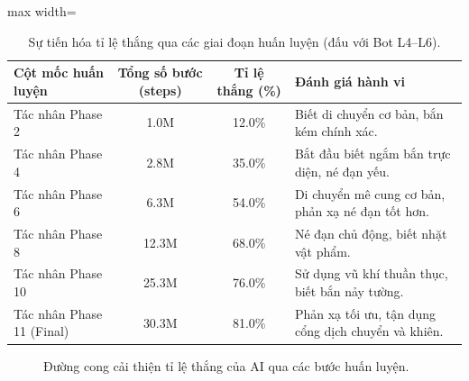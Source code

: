 \documentclass[a4paper, 12pt]{report}
\begin{document}
  \begin{table}[H]
  \centering
  \caption{Sự tiến hóa tỉ lệ thắng qua các giai đoạn huấn luyện (đấu với Bot L4--L6).}
  \label{tab:curriculum_winrate}
  \renewcommand{\arraystretch}{1.2}
  \small
  \begin{adjustbox}{max width=\textwidth}
  \begin{tabular}{l c c p{7cm}}
    \toprule
    \textbf{Cột mốc huấn luyện} & \textbf{Tổng số bước (steps)} & \textbf{Tỉ lệ thắng (\%)} & \textbf{Đánh giá hành vi} \\
    \midrule
    Tác nhân Phase 2  & 1.0M  & 12.0\% & Biết di chuyển cơ bản, bắn kém chính xác. \\
    Tác nhân Phase 4  & 2.8M  & 35.0\% & Bắt đầu biết ngắm bắn trực diện, né đạn yếu. \\
    Tác nhân Phase 6  & 6.3M  & 54.0\% & Di chuyển mê cung cơ bản, phản xạ né đạn tốt hơn. \\
    Tác nhân Phase 8  & 12.3M & 68.0\% & Né đạn chủ động, biết nhặt vật phẩm. \\
    Tác nhân Phase 10 & 25.3M & 76.0\% & Sử dụng vũ khí thuần thục, biết bắn nảy tường. \\
    Tác nhân Phase 11 (Final) & 30.3M & 81.0\% & Phản xạ tối ưu, tận dụng cổng dịch chuyển và khiên. \\
    \bottomrule
  \end{tabular}
  \end{adjustbox}
  \end{table}

  \begin{figure}[H]
  \centering
  \caption{Đường cong cải thiện tỉ lệ thắng của AI qua các bước huấn luyện.}
  \label{fig:learning_curve}
  \end{figure}
\end{document}

